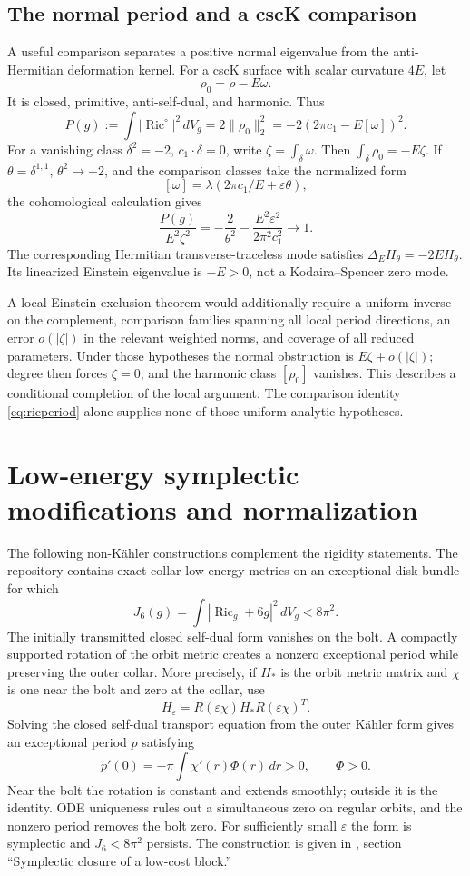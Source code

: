 \documentclass[11pt,a4paper]{article}
\theoremstyle{definition}
\theoremstyle{remark}
\newcommand{\Ric}{\operatorname{Ric}}
\newcommand{\dd}{\,dV_g}
\begin{document}
\subsection{The normal period and a cscK comparison}
A useful comparison separates a positive normal eigenvalue from the anti-Hermitian deformation kernel. For a cscK surface with scalar curvature $4E$, let
\[
 \rho_0=\rho-E\omega.
\]
It is closed, primitive, anti-self-dual, and harmonic. Thus
\begin{equation}\label{eq:ricperiod}
 P(g):=\int|\Ric^\circ|^2\dd
 =2\|\rho_0\|_2^2=-2(2\pi c_1-E[\omega])^2.
\end{equation}
For a vanishing class $\delta^2=-2$, $c_1\cdot\delta=0$, write $\zeta=\int_\delta\omega$. Then $\int_\delta\rho_0=-E\zeta$. If $\theta=\delta^{1,1}$, $\theta^2\to-2$, and the comparison classes take the normalized form
\[
 [\omega]=\lambda(2\pi c_1/E+\varepsilon\theta),
\]
the cohomological calculation gives
\[
 \frac{P(g)}{E^2\zeta^2}
 =-\frac2{\theta^2}-\frac{E^2\varepsilon^2}{2\pi^2c_1^2}\longrightarrow1.
\]
The corresponding Hermitian transverse-traceless mode satisfies $\Delta_EH_\theta=-2EH_\theta$. Its linearized Einstein eigenvalue is $-E>0$, not a Kodaira--Spencer zero mode.

A local Einstein exclusion theorem would additionally require a uniform inverse on the complement, comparison families spanning all local period directions, an error $o(|\zeta|)$ in the relevant weighted norms, and coverage of all reduced parameters. Under those hypotheses the normal obstruction is $E\zeta+o(|\zeta|)$; degree then forces $\zeta=0$, and the harmonic class $[\rho_0]$ vanishes. This describes a conditional completion of the local argument. The comparison identity \eqref{eq:ricperiod} alone supplies none of those uniform analytic hypotheses.

\section{Low-energy symplectic modifications and normalization}
The following non-K\"ahler constructions complement the rigidity statements. The repository contains exact-collar low-energy metrics on an exceptional disk bundle for which
\[
 J_6(g)=\int|\Ric_g+6g|^2\,dV_g<8\pi^2.
\]
The initially transmitted closed self-dual form vanishes on the bolt. A compactly supported rotation of the orbit metric creates a nonzero exceptional period while preserving the outer collar. More precisely, if $H_*$ is the orbit metric matrix and $\chi$ is one near the bolt and zero at the collar, use
\[
 H_\varepsilon=R(\varepsilon\chi)H_*R(\varepsilon\chi)^T.
\]
Solving the closed self-dual transport equation from the outer K\"ahler form gives an exceptional period $p$ satisfying
\[
 p'(0)=-\pi\int\chi'(r)\Phi(r)\,dr>0,\qquad \Phi>0.
\]
Near the bolt the rotation is constant and extends smoothly; outside it is the identity. ODE uniqueness rules out a simultaneous zero on regular orbits, and the nonzero period removes the bolt zero. For sufficiently small $\varepsilon$ the form is symplectic and $J_6<8\pi^2$ persists. The construction is given in \cite{Repository}, section ``Symplectic closure of a low-cost block.''
\end{document}

